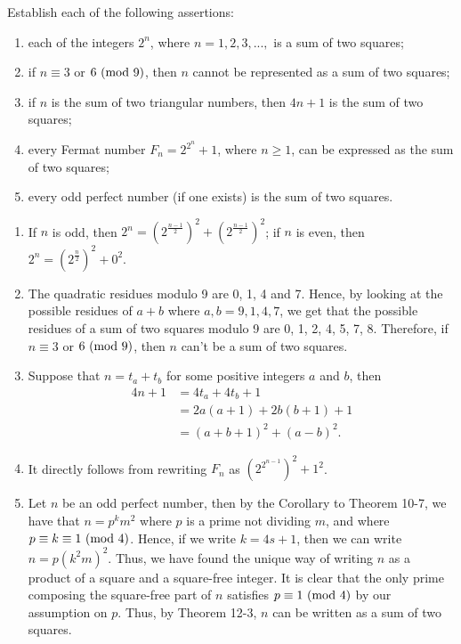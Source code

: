 \begin{exercise}
    Establish each of the following assertions:
    \begin{enumerate}
        \item each of the integers $2^n$, where $n = 1,2,3,...,$ is a sum of two squares;
        \item if $n \equiv 3$ or $6 \ (\mathrm{mod}\ 9)$, then $n$ cannot be represented as a sum of two squares;
        \item if $n$ is the sum of two triangular numbers, then $4n + 1$ is the sum of two squares;
        \item every Fermat number $F_n = 2^{2^n} + 1$, where $n \geq 1$, can be expressed as the sum of two squares;
        \item every odd perfect number (if one exists) is the sum of two squares. \\
    \end{enumerate}
\end{exercise}

\begin{solution}
    \begin{enumerate}
        \item If $n$ is odd, then $2^n = \left(2^{\frac{n-1}{2}}\right)^2 + \left(2^{\frac{n-1}{2}}\right)^2$; if $n$ is even, then $2^n = \left(2^{\frac{n}{2}}\right)^2 + 0^2$.
        \item The quadratic residues modulo 9 are 0, 1, 4 and 7. Hence, by looking at the possible residues of $a + b$ where $a,b=9,1,4,7$, we get that the possible residues of a sum of two squares modulo 9 are 0, 1, 2, 4, 5, 7, 8. Therefore, if $n \equiv 3$ or $6 \ (\mathrm{mod}\ 9)$, then $n$ can't be a sum of two squares.
        \item Suppose that $n = t_a + t_b$ for some positive integers $a$ and $b$, then
        \begin{align*}
            4n+1 &= 4t_a + 4t_b + 1 \\
            &= 2a(a + 1) + 2b(b + 1) + 1 \\
            &= (a+b + 1)^2 + (a-b)^2.
        \end{align*}
        \item It directly follows from rewriting $F_n$ as $(2^{2^{n-1}})^2 + 1^2$.
        \item Let $n$ be an odd perfect number, then by the Corollary to Theorem 10-7, we have that $n = p^km^2$ where $p$ is a prime not dividing $m$, and where $p \equiv k \equiv 1 \ (\mathrm{mod}\ 4)$. Hence, if we write $k = 4s + 1$, then we can write $n = p(k^2m)^2$. Thus, we have found the unique way of writing $n$ as a product of a square and a square-free integer. It is clear that the only prime composing the square-free part of $n$ satisfies $p \equiv 1 \ (\mathrm{mod}\ 4)$ by our assumption on $p$. Thus, by Theorem 12-3, $n$ can be written as a sum of two squares. \\
    \end{enumerate}
\end{solution}


